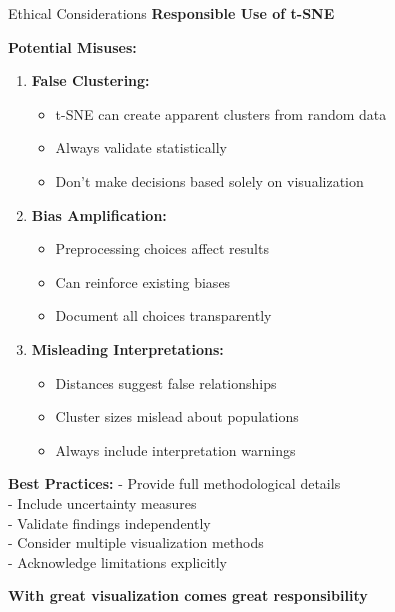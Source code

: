 \documentclass[10pt]{beamer}
\newcommand{\emphtext}[1]{\textcolor{upcblue}{\textbf{#1}}}
\newcommand{\warningbox}[1]{\colorbox{red!10}{\begin{minipage}{0.85\textwidth}\centering #1\end{minipage}}}
\begin{document}
\begin{frame}{Ethical Considerations}
\emphtext{Responsible Use of t-SNE}

\vspace{0.3cm}
\textbf{Potential Misuses:}

\begin{enumerate}
\footnotesize
\item \textbf{False Clustering:}
   \begin{itemize}
   \tiny
   \item t-SNE can create apparent clusters from random data
   \item Always validate statistically
   \item Don't make decisions based solely on visualization
   \end{itemize}

\item \textbf{Bias Amplification:}
   \begin{itemize}
   \tiny
   \item Preprocessing choices affect results
   \item Can reinforce existing biases
   \item Document all choices transparently
   \end{itemize}

\item \textbf{Misleading Interpretations:}
   \begin{itemize}
   \tiny
   \item Distances suggest false relationships
   \item Cluster sizes mislead about populations
   \item Always include interpretation warnings
   \end{itemize}
\end{enumerate}

\vspace{0.3cm}
\textbf{Best Practices:}
\footnotesize
- Provide full methodological details\\
- Include uncertainty measures\\
- Validate findings independently\\
- Consider multiple visualization methods\\
- Acknowledge limitations explicitly

\begin{center}
\warningbox{\footnotesize\textbf{With great visualization comes great responsibility}}
\end{center}
\end{frame}
\end{document}
